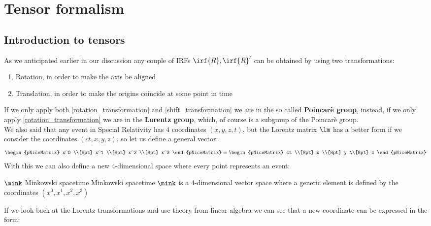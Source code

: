 \chapter{Tensor formalism}
\section{Introduction to tensors}
As we anticipated earlier in our discussion any couple of IRFs $\irf{R}, \irf{R}'$ can be obtained by using two transformations:
\begin{enumerate}
  \item Rotation, in order to make the axis be aligned \label{rotation_transformation}
  \item Translation, in order to make the origins coincide at some point in time \label{shift_transformation}
\end{enumerate}
If we only apply both \eqref{rotation_transformation} and \eqref{shift_transformation} we are in the so called \textbf{Poincarè group}, instead, if we only apply \eqref{rotation_transformation} we are in the \textbf{Lorentz group}, which, of course is a subgroup of the Poincarè group.\\
We also said that any event in Special Relativity has 4 coordinates $(x,y,z,t)$, but the Lorentz matrix $\lm$ has a better form if we consider the coordinates $(ct,x,y,z)$, so let us define a general vector:
\begin{equation}
  \begin{pNiceMatrix}
    x^0 \\[8pt]
    x^1 \\[8pt]
    x^2 \\[8pt]
    x^3
  \end{pNiceMatrix} =
  \begin{pNiceMatrix}
    ct \\[8pt]
    x \\[8pt]
    y \\[8pt]
    z
  \end{pNiceMatrix}
\end{equation}
With this we can also define a new 4-dimensional space where every point represents an event:
\begin{definition}{$\mink$ Minkowski spacetime}
  Minkowski spacetime $\mink$ is a 4-dimensional vector space where a generic element is defined by the coordinates $(x^0, x^1, x^2, x^3)$
\end{definition}
If we look back at the Lorentz transformations and use theory from linear algebra we can see that a new coordinate can be expressed in the form:
